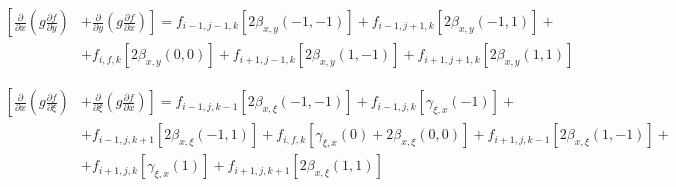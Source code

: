 \begin{equation*}
    \begin{split}
        \left[
            \frac
                {\partial}
                {\partial x}
            \left(
                g
                \frac
                    {\partial f}
                    {\partial y}
            \right)
        \right.
            &
        \left.
            +
            \frac
                {\partial}
                {\partial y}
            \left(
                g
                \frac
                    {\partial f}
                    {\partial x}
            \right)
        \right]
        =
        f_{i-1, j-1, k}
        \left[
            2
            \beta_{x,y} \left(-1, -1\right)
        \right]
        +
        f_{i-1, j+1, k}
        \left[
            2
            \beta_{x,y} \left(-1, 1\right)
        \right]
        +
        \\
        &
        +
        f_{i, f, k}
        \left[
            2
            \beta_{x,y} \left(0, 0\right)
        \right]
        +
        f_{i+1, j-1, k}
        \left[
            2
            \beta_{x,y} \left(1, -1\right)
        \right]
        +
        f_{i+1, j+1, k}
        \left[
            2
            \beta_{x,y} \left(1, 1\right)
        \right]
    \end{split}
\end{equation*}

\begin{equation*}
    \begin{split}
        \left[
            \frac
                {\partial}
                {\partial x}
            \left(
                g
                \frac
                    {\partial f}
                    {\partial \xi}
            \right)
        \right.
            &
        \left.
            +
            \frac
                {\partial}
                {\partial \xi}
            \left(
                g
                \frac
                    {\partial f}
                    {\partial x}
            \right)
        \right]
        =
        f_{i-1, j, k-1}
        \left[
            2
            \beta_{x, \xi} \left(-1, -1\right)
        \right]
        +
        f_{i-1, j, k}
        \left[
            \gamma_{\xi, x} \left(-1\right)
        \right]
        +
        \\
        &
        +
        f_{i-1, j, k+1}
        \left[
            2
            \beta_{x, \xi} \left(-1, 1\right)
        \right]
        +
        f_{i, f, k}
        \left[
            \gamma_{\xi, x} \left(0\right)
            +
            2
            \beta_{x, \xi} \left(0, 0\right)
        \right]
        +
        f_{i+1, j, k-1}
        \left[
            2
            \beta_{x, \xi} \left(1, -1\right)
        \right]
        +
        \\
        &
        +
        f_{i+1, j, k}
        \left[
            \gamma_{\xi, x} \left(1\right)
        \right]
        +
        f_{i+1, j, k+1}
        \left[
            2
            \beta_{x, \xi} \left(1, 1\right)
        \right]
    \end{split}
\end{equation*}

